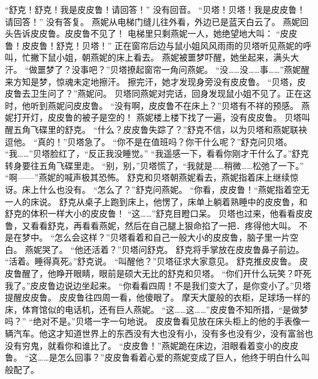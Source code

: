 \documentclass[a4paper,12pt,UTF8,twoside]{ctexbook}
\begin{document}
        “舒克！舒克！我是皮皮鲁！请回答！”        
        没有回音。  
        “贝塔！贝塔！我是皮皮鲁！请回答！”  
        没有答复。  
        燕妮从电梯门缝儿往外看，外边已是蓝天白云了。  
        燕妮回头告诉皮皮鲁。皮皮鲁不见了！  
        电梯里只剩燕妮一人，她绝望地大叫：  
        “皮皮鲁！皮皮鲁！舒克！贝塔！”  
        正在窗帘后边与鼠小姐风风雨雨的贝塔听见燕妮的呼叫，忙撇下鼠小姐，朝燕妮的床上看去。  
        燕妮被噩梦吓醒，她坐起来，满头大汗。  
        “做噩梦了？没事吧？”贝塔撩起窗帘一角问燕妮。  
        “没……没……事……”燕妮醒来方知是梦，惊魂未定地擦汗。  
        擦完汗，她才发现身旁没有皮皮鲁。  
        “贝塔，皮皮鲁去卫生问了？”燕妮问。  
        贝塔同燕妮对完话，回身发现鼠小姐不见了。正在这时，他听到燕妮问皮皮鲁。  
        “没有啊，皮皮鲁不在床上？”贝塔有不祥的预感。  
        燕妮打开灯，皮皮鲁的被子是空的！  
        燕妮楼上楼下找了一遍，没有皮皮鲁。  
        贝塔叫醒五角飞碟里的舒克。        
        “什么？皮皮鲁失踪了？”舒克不信，以为贝塔和燕妮联袂逗他。  
        “真的！”贝塔急了。  
        “你不是在值班吗？你干什么呢？”舒克问贝塔。  
        “我……”贝塔脸红了，“反正我没睡觉。”  
        “我遥感一下，看看你刚才干什么了。”舒克转身要往五角飞碟里走。  
        “别，别，”贝塔慌了，“我就是……稍微……松弛了一下。”  
        “啊——”燕妮的喊声极其恐怖。  
        舒克和贝塔朝燕妮看去，燕妮指着床上继续惊讶。床上什么也没有。  
        “怎么了？”舒克问燕妮。  
        “你看，皮皮鲁！“燕妮指着空无一人的床说。  
        舒克从桌子上跑到床上，他愣了，床单上躺着熟睡中的皮皮鲁，和舒克的体积一样大小的皮皮鲁！  
        “这……”舒克目瞪口呆。  
        贝塔也过来，他看看皮皮鲁，又看看舒克，再看看燕妮，然后在自己腿上狠命掐了一把．疼得他大叫。  
        不是在梦中。  
        “怎么会这样？”贝塔看着和自己一般大小的皮皮鲁，脑子里一片空白。  
        燕妮哭了。        
        “他还活着？”贝塔问舒克。  
        舒克将手掌放在皮皮鲁鼻子前边。  
        “活着。睡得真死。”舒克说。  
        “叫醒他？”贝塔征求大家意见。  
        舒克推皮皮鲁。  
        皮皮鲁醒了，他睁开眼睛，眼前是硕大无比的舒克和贝塔。  
        “你们开什么玩笑？吓死我了。”皮皮鲁边说边坐起来。  
        “你看看四周！不是我们变大了，是你变小了。”贝塔提醒皮皮鲁。  
        皮皮鲁往四周一看，他傻眼了。  
        摩天大厦般的衣柜，足球场一样的床，体育馆似的电话机，还有巨人燕妮。  
        “这……这……”皮皮鲁不知所措，“是做梦吗？”  
        “绝对不是。”贝塔一字一句地说。  
        皮皮鲁看见放在床头柜上的他的手表像一辆汽车。他这才知道世界上的东西没有大也没有小，没有多也没有少，没有富翁也没有穷鬼，就看你和谁比了。  
        “皮皮鲁！”燕妮跪在床边，泪眼看着变小的皮皮鲁。  
        “这……是怎么回事？”皮皮鲁看着心爱的燕妮变成了巨人，他终于明白什么叫般配了。  
\end{document}
